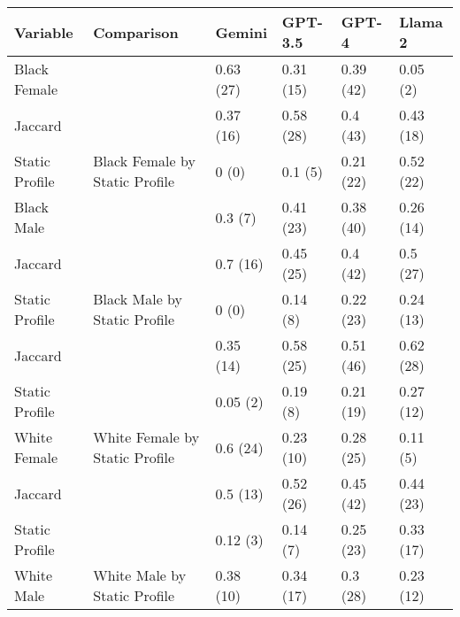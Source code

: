 
\begin{tabular}{llllll}
\toprule
Variable & Comparison & Gemini & GPT-3.5 & GPT-4 & Llama 2\\
\midrule
Black Female &  & 0.63 (27) & 0.31 (15) & 0.39 (42) & 0.05 (2)\\

Jaccard &  & 0.37 (16) & 0.58 (28) & 0.4 (43) & 0.43 (18)\\

Static Profile & \multirow{-3}{*}{\raggedright\arraybackslash Black Female by Static Profile} & 0 (0) & 0.1 (5) & 0.21 (22) & 0.52 (22)\\
\cmidrule{1-6}
Black Male &  & 0.3 (7) & 0.41 (23) & 0.38 (40) & 0.26 (14)\\

Jaccard &  & 0.7 (16) & 0.45 (25) & 0.4 (42) & 0.5 (27)\\

Static Profile & \multirow{-3}{*}{\raggedright\arraybackslash Black Male by Static Profile} & 0 (0) & 0.14 (8) & 0.22 (23) & 0.24 (13)\\
\cmidrule{1-6}
Jaccard &  & 0.35 (14) & 0.58 (25) & 0.51 (46) & 0.62 (28)\\

Static Profile &  & 0.05 (2) & 0.19 (8) & 0.21 (19) & 0.27 (12)\\

White Female & \multirow{-3}{*}{\raggedright\arraybackslash White Female by Static Profile} & 0.6 (24) & 0.23 (10) & 0.28 (25) & 0.11 (5)\\
\cmidrule{1-6}
Jaccard &  & 0.5 (13) & 0.52 (26) & 0.45 (42) & 0.44 (23)\\

Static Profile &  & 0.12 (3) & 0.14 (7) & 0.25 (23) & 0.33 (17)\\

White Male & \multirow{-3}{*}{\raggedright\arraybackslash White Male by Static Profile} & 0.38 (10) & 0.34 (17) & 0.3 (28) & 0.23 (12)\\
\bottomrule
\end{tabular}

